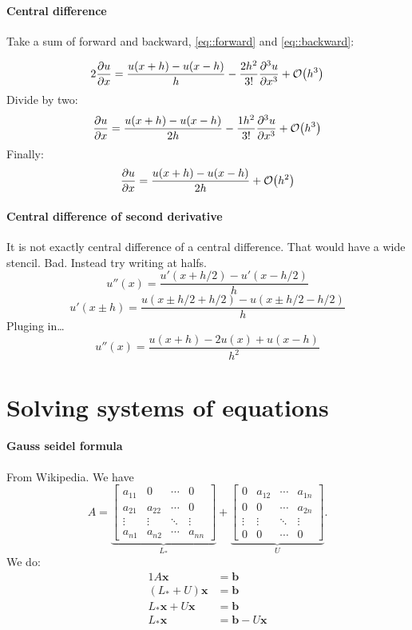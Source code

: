 \documentclass{article}
\begin{document}
\paragraph{Central difference}
Take a sum of forward and backward, \autoref{eq::forward} and 
\autoref{eq::backward}:

\begin{equation}\label{eq::backward}
   2\pdv{u}{x} 
   = \frac{u(x+h) - u(x-h)}{h}  
  - \frac{2 h^2}{3!}\pdv[3]{u}{x} 
  + \mathcal{O}\qty(h^3)
\end{equation}
Divide by two:
\begin{equation}\label{eq::backward}
   \pdv{u}{x} 
   = \frac{u(x+h) - u(x-h)}{2h}  
  - \frac{1 h^2}{3!}\pdv[3]{u}{x} 
  + \mathcal{O}\qty(h^3)
\end{equation}
Finally:
\begin{equation}\label{eq::backward}
   \pdv{u}{x} 
   = \frac{u(x+h) - u(x-h)}{2h}  
  + \mathcal{O}\qty(h^2)
\end{equation}

\paragraph{Central difference of second derivative}
It is not exactly central difference of a central difference. That would have 
a wide stencil. Bad. Instead try writing at halfs.
\[
  u''(x) = \frac{u'(x+h/2) - u'(x-h/2)}{h}
\]
\[
  u'(x\pm h) = \frac{u(x\pm h/2 + h/2) - u(x \pm h/2 - h/2)}{h}
\]
Pluging in\dots
\[
  u''(x) = \frac{ u(x + h) - 2 u(x) + u(x-h) }{h^2}
\]

\section{Solving systems of equations}
\paragraph{Gauss seidel formula}
From Wikipedia. We have 
\[
  A =
\underbrace{
\begin{bmatrix} a_{11} & 0 & \cdots & 0 \\ a_{21} & a_{22} & \cdots & 0 \\ \vdots & \vdots & \ddots & \vdots \\a_{n1} & a_{n2} & \cdots & a_{nn} \end{bmatrix}
}_{\textstyle L_*}
+
\underbrace{
\begin{bmatrix} 0 & a_{12} & \cdots & a_{1n} \\ 0 & 0 & \cdots & a_{2n} \\ \vdots & \vdots & \ddots & \vdots \\0 & 0 & \cdots & 0 \end{bmatrix}
}_{\textstyle U}
.
\]
We do:
\begin{alignat}{1}
A\mathbf x &= \mathbf b \\
(L_*+U) \mathbf x &= \mathbf b \\
L_* \mathbf x+U\mathbf x &= \mathbf b \\
L_* \mathbf{x} &= \mathbf{b} - U \mathbf{x}
\end{alignat}
\end{document}
